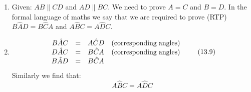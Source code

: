 {\begin{mdframed}[linewidth=4, leftmargin=40, rightmargin=40]
\begin{exercise}
\begin{enumerate}[noitemsep, label=\textbf{Step} \textbf{\arabic*}. ]
\begin{figure}[H]
\begin{center}
      \vspace{2pt}
    \vspace{.1in}
    \end{center}
 \end{figure}       
\item Given: $AB\parallel CD$ and $AD\parallel BC$. We need to prove $A=C$ and $B=D$. In the formal language of maths we say that we are required to prove (RTP) $B\hat{A}D=B\hat{C}A$ and $A\hat{B}C=A\hat{D}C$. \item \label{m39352*id3468}\nopagebreak\noindent{}
    \begin{equation}
    \begin{array}{cccc}\hfill B\hat{A}C& =& A\hat{C}D\hfill & \left(\mathrm{corresponding\; angles}\right)\\ \hfill D\hat{A}C& =& B\hat{C}A\hfill & \left(\mathrm{corresponding\; angles}\right)\\ \hfill B\hat{A}D& =& B\hat{C}A\hfill & \end{array}\tag{13.9}
      \end{equation}
Similarly we find that: 
\label{m39352*id97}\nopagebreak\noindent{}
    \begin{equation}
    A\hat{B}C=A\hat{D}C\tag{13.10}
      \end{equation}
\end{enumerate}
    \end{exercise}
    \end{mdframed}
    }
    \noindent
\par
            \label{m39352*probfhsst!!!underscore!!!id073}\vspace{.5cm} 
      \noindent
